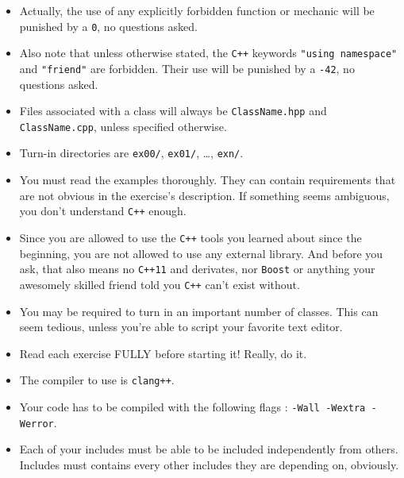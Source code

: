 \begin{itemize}
\begin{itemize}
		  \end{itemize}

		\item Actually, the use of any explicitly forbidden function or
		mechanic will be punished by a \texttt{0}, no questions asked.

        \item Also note that unless otherwise stated, the \texttt{C++}
          keywords \texttt{"using namespace"} and \texttt{"friend"} are
          forbidden. Their use will be punished by a \texttt{-42}, no
          questions asked.

        \item Files associated with a class will always be
          \texttt{ClassName.hpp} and \texttt{ClassName.cpp}, unless
          specified otherwise.

        \item Turn-in directories are \texttt{ex00/}, \texttt{ex01/},
          \dots, \texttt{exn/}.

        \item You must read the examples thoroughly. They can contain
          requirements that are not obvious in the exercise's
          description. If something seems ambiguous, you don't
          understand \texttt{C++} enough.

        \item Since you are allowed to use the \texttt{C++} tools you
          learned about since the beginning, you are not
          allowed to use any external library. And before you ask,
          that also means no \texttt{C++11} and derivates, nor
          \texttt{Boost} or anything your awesomely skilled friend
          told you \texttt{C++} can't exist without.

        \item You may be required to turn in an important number of
          classes. This can seem tedious, unless you're able to script
          your favorite text editor.

        \item Read each exercise FULLY before starting it! Really, do it.

        \item The compiler to use is \texttt{clang++}.

        \item Your code has to be compiled with the following
          flags : \texttt{-Wall -Wextra -Werror}.

        \item Each of your includes must be able to be included
          independently from others. Includes must contains every
          other includes they are depending on, obviously.


\end{itemize}
